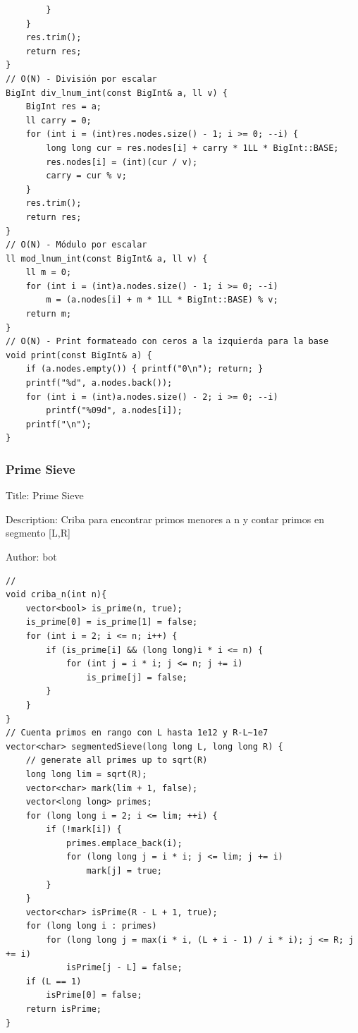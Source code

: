 \documentclass[10pt,landscape,twocolumn]{article}
\begin{document}
\begin{lstlisting}
        }
    }
    res.trim();
    return res;
}
// O(N) - División por escalar
BigInt div_lnum_int(const BigInt& a, ll v) {
    BigInt res = a;
    ll carry = 0;
    for (int i = (int)res.nodes.size() - 1; i >= 0; --i) {
        long long cur = res.nodes[i] + carry * 1LL * BigInt::BASE;
        res.nodes[i] = (int)(cur / v);
        carry = cur % v;
    }
    res.trim();
    return res;
}
// O(N) - Módulo por escalar
ll mod_lnum_int(const BigInt& a, ll v) {
    ll m = 0;
    for (int i = (int)a.nodes.size() - 1; i >= 0; --i)
        m = (a.nodes[i] + m * 1LL * BigInt::BASE) % v;
    return m;
}
// O(N) - Print formateado con ceros a la izquierda para la base
void print(const BigInt& a) {
    if (a.nodes.empty()) { printf("0\n"); return; }
    printf("%d", a.nodes.back());
    for (int i = (int)a.nodes.size() - 2; i >= 0; --i)
        printf("%09d", a.nodes[i]);
    printf("\n");
}
\end{lstlisting}

\subsubsection{Prime Sieve}
\begin{flushleft}
\footnotesize\ttfamily
\par\noindent Title: Prime Sieve
\par\noindent Description: Criba para encontrar primos menores a n y contar primos en segmento [L,R]
\par\noindent Author: bot
\end{flushleft}

\begin{lstlisting}
//
void criba_n(int n){
    vector<bool> is_prime(n, true);
    is_prime[0] = is_prime[1] = false;
    for (int i = 2; i <= n; i++) {
        if (is_prime[i] && (long long)i * i <= n) {
            for (int j = i * i; j <= n; j += i)
                is_prime[j] = false;
        }
    }
}
// Cuenta primos en rango con L hasta 1e12 y R-L~1e7
vector<char> segmentedSieve(long long L, long long R) {
    // generate all primes up to sqrt(R)
    long long lim = sqrt(R);
    vector<char> mark(lim + 1, false);
    vector<long long> primes;
    for (long long i = 2; i <= lim; ++i) {
        if (!mark[i]) {
            primes.emplace_back(i);
            for (long long j = i * i; j <= lim; j += i)
                mark[j] = true;
        }
    }
    vector<char> isPrime(R - L + 1, true);
    for (long long i : primes)
        for (long long j = max(i * i, (L + i - 1) / i * i); j <= R; j += i)
            isPrime[j - L] = false;
    if (L == 1)
        isPrime[0] = false;
    return isPrime;
}
\end{lstlisting}
\end{document}
